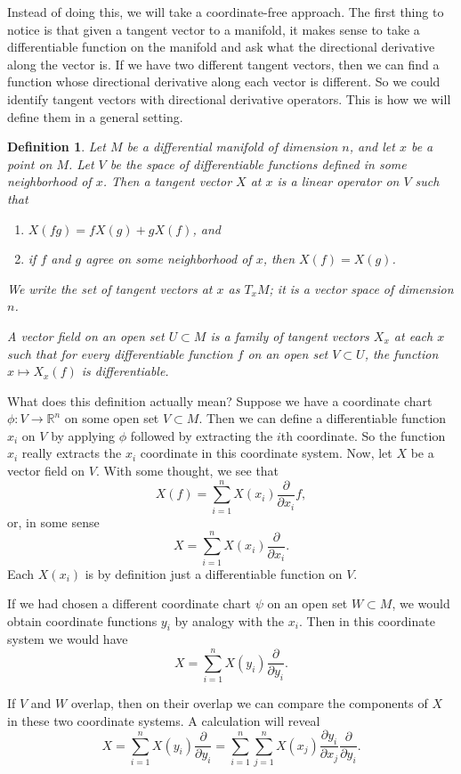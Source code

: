 \documentclass[12pt]{article}
\newtheorem*{defn}{Definition}
\theoremstyle{remark}
\begin{document}
Instead of doing this, we will take a coordinate-free approach.  The first thing to notice is that given a tangent vector to a manifold, it makes sense to take a differentiable function on the manifold and ask what the directional derivative along the vector is.  If we have two different tangent vectors, then we can find a function whose directional derivative along each vector is different.  So we could identify tangent vectors with directional derivative operators.  This is how we will define them in a general setting.

\begin{defn}
Let $M$ be a differential manifold of dimension $n$, and let $x$ be a point on $M$.  Let $V$ be the space of differentiable functions defined in some neighborhood of $x$.  Then a \emph{tangent vector} $X$ at $x$ is a linear operator on $V$ such that
\begin{enumerate}
\item $X(fg) = fX(g)+gX(f)$, and
\item if $f$ and $g$ agree on some neighborhood of $x$, then $X(f)=X(g)$.
\end{enumerate}
We write the set of tangent vectors at $x$ as $T_xM$; it is a vector space of dimension $n$.

A \emph{vector field} on an open set $U\subset M$ is a family of tangent vectors $X_x$ at each $x$ such that for every differentiable function $f$ on an open set $V\subset U$, the function $x\mapsto X_x(f)$ is differentiable.
\end{defn}

What does this definition actually mean?  Suppose we have a coordinate chart $\phi\colon V\to \mathbb{R}^n$ on some open set $V\subset M$.  Then we can define a differentiable function $x_i$ on $V$ by applying $\phi$ followed by extracting the $i$th coordinate.  So the function $x_i$ really extracts the $x_i$ coordinate in this coordinate system.  Now, let $X$ be a vector field on $V$.  With some thought, we see that
\[
X(f) = \sum_{i=1}^n X(x_i)\frac{\partial}{\partial x_i} f,
\]
or, in some sense
\[
X = \sum_{i=1}^n X(x_i)\frac{\partial}{\partial x_i}.
\]
Each $X(x_i)$ is by definition just a differentiable function on $V$. 

If we had chosen a different coordinate chart $\psi$ on an open set $W\subset M$, we would obtain coordinate functions $y_i$ by analogy with the $x_i$.  Then in this coordinate system we would have
\[
X = \sum_{i=1}^n X(y_i)\frac{\partial}{\partial y_i}.
\]

If $V$ and $W$ overlap, then on their overlap we can compare the components of $X$ in these two coordinate systems.  A calculation will reveal
\[
X = \sum_{i=1}^n X(y_i)\frac{\partial}{\partial y_i}
  = \sum_{i=1}^n \sum_{j=1}^n X(x_j)\frac{\partial y_i}{\partial x_j}\frac{\partial}{\partial y_i}.
\]
\end{document}

